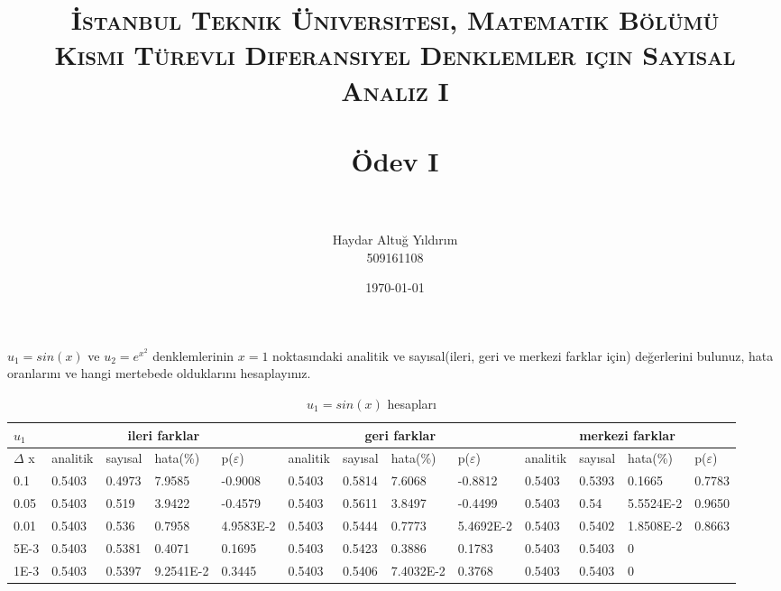 \documentclass[paper=a4, fontsize=11pt]{scrartcl} %
\title{	
\normalfont \normalsize 
\textsc{\.{I}stanbul Teknik \"Universitesi, Matematik B\"ol\"um\"u \\ Kismi T\"urevli Diferansiyel Denklemler i\c{c}in Sayisal Analiz I} \\ [25pt]
\horrule{0.5pt} \\[0.4cm] %
\large \"Odev I \\ %
\horrule{0.5pt} \\[0.4cm] %
}
\author{Haydar Altu\u{g} Y{\i}ld{\i}r{\i}m \\ 509161108}
\date{\normalsize\today} %
\numberwithin{equation}{section} %
\numberwithin{figure}{section} %
\numberwithin{table}{section} %
\begin{document}
\maketitle %


$u_1=sin(x)$ ve $u_2 = e ^{ {x^ 2}} $ denklemlerinin $x=1$ noktas{\i}ndaki analitik ve say{\i}sal(ileri, geri ve merkezi farklar i\c{c}in) de\u{g}erlerini bulunuz, hata oranlar{\i}n{\i} ve hangi mertebede olduklar{\i}n{\i} hesaplay{\i}n{\i}z.

\begin{table}[ht]
\centering
\begin{adjustbox}{width=1\textwidth}
\small
\begin{tabular}{ | l | l | l | l | l | l | l | l | l | l | l | l | l | }
\hline
	$u_1$ & \multicolumn{4}{c|}{ileri farklar}  & \multicolumn{4}{c|}{geri farklar} &  \multicolumn{4}{c|}{merkezi farklar}   \\ \hline
	$\Delta$ x & analitik & say{\i}sal & hata(\%) & p($\varepsilon$) & analitik & say{\i}sal & hata(\%) & p($\varepsilon$) & analitik & say{\i}sal & hata(\%) & p($\varepsilon$) \\ \hline
	0.1 & 0.5403 & 0.4973 & 7.9585 & -0.9008 & 0.5403 & 0.5814 & 7.6068 & -0.8812 & 0.5403 & 0.5393 & 0.1665 & 0.7783 \\ \hline
	0.05 & 0.5403 & 0.519 & 3.9422 & -0.4579 & 0.5403 & 0.5611 & 3.8497 & -0.4499 & 0.5403 & 0.54 & 5.5524E-2 & 0.9650 \\ \hline
	0.01 & 0.5403 & 0.536 & 0.7958 & 4.9583E-2 & 0.5403 & 0.5444 & 0.7773 & 5.4692E-2 & 0.5403 & 0.5402 & 1.8508E-2 & 0.8663 \\ \hline
	5E-3 & 0.5403 & 0.5381 & 0.4071 & 0.1695 & 0.5403 & 0.5423 & 0.3886 & 0.1783 & 0.5403 & 0.5403 & 0 &  \\ \hline
	1E-3 & 0.5403 & 0.5397 & 9.2541E-2 & 0.3445 & 0.5403 & 0.5406 & 7.4032E-2 & 0.3768 & 0.5403 & 0.5403 & 0 &  \\ \hline
\end{tabular}
\end{adjustbox}
\caption{$u_1 = sin(x)$ hesaplar{\i}}
\end{table} 
\end{document}
